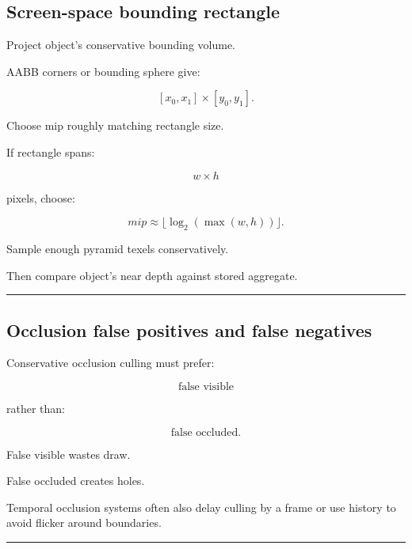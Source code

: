 \subsection{Screen-space bounding rectangle}\label{04-visual-computing-ii-ch040-screen-space-bounding-rectangle}

\hypertarget{04-visual-computing-ii-ch040-screen-space-bounding-rectangle}{}

Project object's conservative bounding volume.

AABB corners or bounding sphere give:

\[
[x_0,x_1]
\times
[y_0,y_1].
\]

Choose mip roughly matching rectangle size.

If rectangle spans:

\[
w\times h
\]

pixels, choose:

\[
mip\approx
\lfloor\log_2(\max(w,h))\rfloor.
\]

Sample enough pyramid texels conservatively.

Then compare object's near depth against stored aggregate.

\begin{center}\rule{0.5\linewidth}{0.5pt}\end{center}

\subsection{Occlusion false positives and false negatives}\label{04-visual-computing-ii-ch040-occlusion-false-positives-and-false-negatives}

\hypertarget{04-visual-computing-ii-ch040-occlusion-false-positives-and-false-negatives}{}

Conservative occlusion culling must prefer:

\[
\boxed{
\text{false visible}
}
\]

rather than:

\[
\boxed{
\text{false occluded}.
}
\]

False visible wastes draw.

False occluded creates holes.

Temporal occlusion systems often also delay culling by a frame or use history to avoid flicker around boundaries.

\begin{center}\rule{0.5\linewidth}{0.5pt}\end{center}

